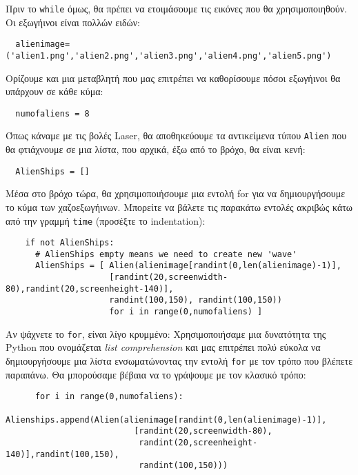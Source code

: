 Πριν το {\tt while} όμως, θα πρέπει να ετοιμάσουμε τις εικόνες που θα χρησιμοποιηθούν. Οι εξωγήινοι είναι πολλών ειδών:

\begin{verbatim}
  alienimage=('alien1.png','alien2.png','alien3.png','alien4.png','alien5.png')
\end{verbatim}

Ορίζουμε και μια μεταβλητή που μας επιτρέπει να καθορίσουμε πόσοι εξωγήινοι θα υπάρχουν σε κάθε κύμα:

\begin{verbatim}
  numofaliens = 8
\end{verbatim}

Όπως κάναμε με τις βολές Laser, θα αποθηκεύουμε τα αντικείμενα τύπου {\tt Alien} που θα φτιάχνουμε σε μια λίστα, που αρχικά, έξω από το βρόχο, θα είναι κενή:

\begin{verbatim}
  AlienShips = []
\end{verbatim}

Μέσα στο βρόχο τώρα, θα χρησιμοποιήσουμε μια εντολή for για να δημιουργήσουμε το κύμα των χαζοεξωγήινων. Μπορείτε να βάλετε τις παρακάτω εντολές ακριβώς κάτω από την γραμμή {\tt time} (προσέξτε το indentation):

\begin{verbatim}
    if not AlienShips:
      # AlienShips empty means we need to create new 'wave'
      AlienShips = [ Alien(alienimage[randint(0,len(alienimage)-1)],
                     [randint(20,screenwidth-80),randint(20,screenheight-140)],
                     randint(100,150), randint(100,150))
                     for i in range(0,numofaliens) ]
\end{verbatim}

Αν ψάχνετε το {\tt for}, είναι λίγο κρυμμένο: Χρησιμοποιήσαμε μια δυνατότητα της Python που ονομάζεται \emph{list comprehension} και μας επιτρέπει πολύ εύκολα να δημιουργήσουμε μια λίστα ενσωματώνοντας την εντολή {\tt for} με τον τρόπο που βλέπετε παραπάνω. Θα μπορούσαμε βέβαια να το γράψουμε με τον κλασικό τρόπο:

\begin{verbatim}
      for i in range(0,numofaliens):
        Alienships.append(Alien(alienimage[randint(0,len(alienimage)-1)],
                          [randint(20,screenwidth-80),
                           randint(20,screenheight-140)],randint(100,150),
                           randint(100,150)))
\end{verbatim}

